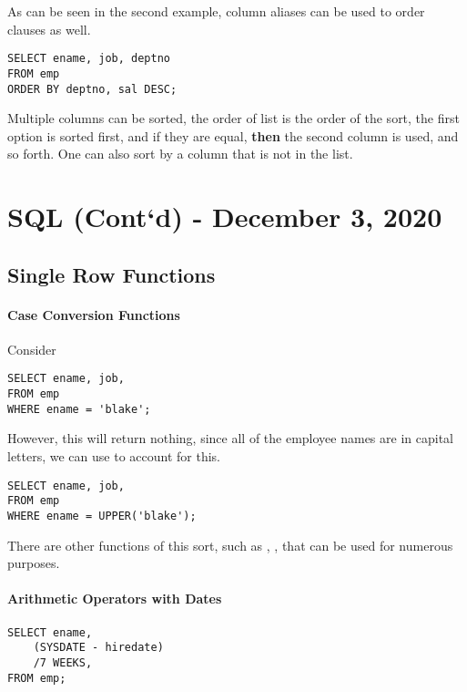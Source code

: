 \documentclass[11pt,a4paper,twocolumn]{book}
\begin{document}
As can be seen in the second example, column aliases can be used to order clauses as well.\\

\begin{lstlisting}
SELECT ename, job, deptno
FROM emp 
ORDER BY deptno, sal DESC;
\end{lstlisting}

Multiple columns can be sorted, the order of  list is the order of the sort, the first option is sorted first, and if they are equal, \textbf{then} the second column is used, and so forth. One can also sort by a column that is not in the  list.

\chapter{SQL (Cont`d) - December 3, 2020}

\section{Single Row Functions}

\subsubsection{Case Conversion Functions}

Consider
\begin{lstlisting}
SELECT ename, job,
FROM emp
WHERE ename = 'blake';
\end{lstlisting}

However, this will return nothing, since all of the employee names are in capital letters, we can use  to account for this.

\begin{lstlisting}
SELECT ename, job,
FROM emp
WHERE ename = UPPER('blake');
\end{lstlisting}

There are other functions of this sort, such as , ,  that can be used for numerous purposes.

\subsubsection{Arithmetic Operators with Dates}

\begin{lstlisting}
SELECT ename, 
	(SYSDATE - hiredate)
	/7 WEEKS,
FROM emp;
\end{lstlisting}
\end{document}
